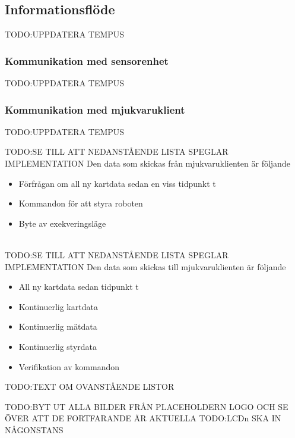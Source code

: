 \documentclass{article}
\begin{document}
\subsection{Informationsflöde}
TODO:UPPDATERA TEMPUS

\subsubsection{Kommunikation med sensorenhet}
TODO:UPPDATERA TEMPUS

\subsubsection{Kommunikation med mjukvaruklient}
TODO:UPPDATERA TEMPUS

TODO:SE TILL ATT NEDANSTÅENDE LISTA SPEGLAR IMPLEMENTATION
Den data som skickas från mjukvaruklienten är följande
\begin{itemize}
\item Förfrågan om all ny kartdata sedan en viss tidpunkt t
\item Kommandon för att styra roboten
\item Byte av exekveringsläge
\end{itemize}
\ \\

TODO:SE TILL ATT NEDANSTÅENDE LISTA SPEGLAR IMPLEMENTATION
Den data som skickas till mjukvaruklienten är följande
\begin{itemize}
\item All ny kartdata sedan tidpunkt t
\item Kontinuerlig kartdata
\item Kontinuerlig mätdata
\item Kontinuerlig styrdata
\item Verifikation av kommandon
\end{itemize}

TODO:TEXT OM OVANSTÅENDE LISTOR

\nocite{*}
{}


TODO:BYT UT ALLA BILDER FRÅN PLACEHOLDERN LOGO OCH SE ÖVER ATT DE FORTFARANDE ÄR AKTUELLA
TODO:LCDn SKA IN NÅGONSTANS
\end{document}

